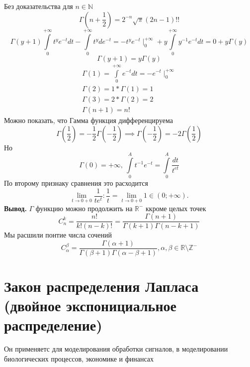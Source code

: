 \documentclass[14pt]{extarticle}
\begin{document}
	Без доказательства для $n \in \mathbb{N}$
	\begin{equation}
		\Gamma(n + \frac{1}{2}) = 2^{-n} \sqrt{\pi} (2n -1)!!
	\end{equation}
	\begin{equation}
		\Gamma(y+1) \int\limits_{0}^{+\infty}  t^{y}e^{-t}dt
		- \int\limits_{0}^{+\infty}  t^{y} d e^{-t}=
		-t^{y}e^{-t} \mid_{0}^{+\infty} + y \int\limits_{0}^{+\infty} y^{-1} e^{-t} dt = 0 + y \Gamma(y)
	\end{equation}
	\begin{equation}
		\Gamma(y+1) = y \Gamma(y)
	\end{equation}
\begin{eqnarray}
	\Gamma(1) = \int\limits_{0}^{+\infty}  e^{-t} dt = -e^{-t}\mid_{0}^{+\infty}\\
	\Gamma(2) = 1*\Gamma(1) =1\\
	\Gamma(3) = 2*\Gamma(2) = 2\\
	\Gamma(n+1) = n!
\end{eqnarray}
Можно показать, что Гамма функция дифференцируема
\begin{equation}
		\Gamma(\frac{1}{2}) = -\frac{1}{2}\Gamma(-\frac{1}{2})
		\implies \Gamma(-\frac{1}{2}) = -2 \Gamma(\frac{1}{2})
\end{equation}
Но 
\begin{equation}
	\Gamma(0) = + \infty , ~ \int\limits_{0}^{A}   t^{-1}e^{-t} = \int\limits_{0}^{A}  \frac{dt}{t^{et}}
\end{equation}
По второму признаку сравнения это расходится
\[
\lim_{t \to 0+0}  \frac{1}{te^{t}} : \frac{1}{t} = \lim_{t \to 0+0} 1 \in (0;+\infty)
.\] 
\textbf{Вывод.} $\Gamma$ функцию можно продолжить на  $\mathbb{R}^{-}$ ккроме целых точек
\begin{equation}
	C_{n}^{k} = \frac{n!}{k! (n-k)!} = \frac{\Gamma(n+1)}{\Gamma(k+1)\Gamma(n - k + 1)}
\end{equation}
Мы расшили понтие числа сочений
 \begin{equation}
 	C_{\alpha}^{\beta} = 
	\frac{\Gamma(\alpha + 1)}{\Gamma(\beta + 1) \Gamma(\alpha -\beta + 1)} ,  \alpha,\beta \in \mathbb{R} \setminus \mathbb{Z}^{-}
 \end{equation}
 \section{Закон распределения Лапласа (двойное экспонициальное распределение)}
 Он применяетс для моделирования обработки сигналов, в моделировании биологических процессов, экономике и финансах
\end{document}
